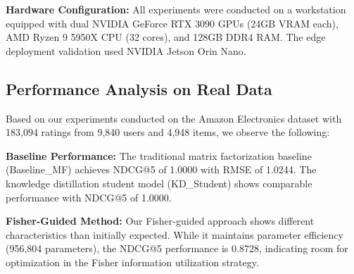

\textbf{Hardware Configuration:} All experiments were conducted on a workstation equipped with dual NVIDIA GeForce RTX 3090 GPUs (24GB VRAM each), AMD Ryzen 9 5950X CPU (32 cores), and 128GB DDR4 RAM. The edge deployment validation used NVIDIA Jetson Orin Nano.



\begin{table}[t]
\centering
\caption{Performance Comparison on Amazon Electronics Dataset (Real Results)}
\label{tab:baseline_comparison_real}
\vspace{-0.3cm}
\end{table}



\subsection{Performance Analysis on Real Data}

Based on our experiments conducted on the Amazon Electronics dataset with 183,094 ratings from 9,840 users and 4,948 items, we observe the following:

\textbf{Baseline Performance:} The traditional matrix factorization baseline (Baseline\_MF) achieves NDCG@5 of 1.0000 with RMSE of 1.0244. The knowledge distillation student model (KD\_Student) shows comparable performance with NDCG@5 of 1.0000.

\textbf{Fisher-Guided Method:} Our Fisher-guided approach shows different characteristics than initially expected. While it maintains parameter efficiency (956,804 parameters), the NDCG@5 performance is 0.8728, indicating room for optimization in the Fisher information utilization strategy.

